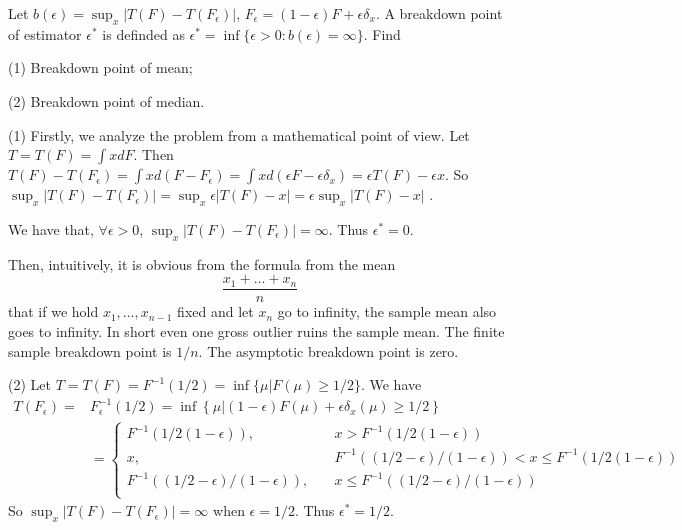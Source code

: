\begin{problem}
    Let $b(\epsilon)=\sup_x|T(F)-T(F_\epsilon)|$, $F_\epsilon=(1-\epsilon)F+\epsilon\delta_x$. A breakdown point of estimator $\epsilon^*$ is definded as $\epsilon^*=\inf\{\epsilon> 0: b(\epsilon)=\infty\}$. Find

    (1) Breakdown point of mean;

    (2) Breakdown point of median. 
\end{problem}

\begin{solution}
    (1) 
    Firstly, we analyze the problem from a mathematical point of view. 
    Let $T = T(F) = \int x dF$. 
    Then $T(F) - T(F_\epsilon) = \int x d (F - F_\epsilon) = \int x d (\epsilon F - \epsilon\delta_x) =  \epsilon T(F) - \epsilon x $.
    So $\sup_x|T(F)-T(F_\epsilon)| = \sup_x \epsilon  | T(F) - x | = \epsilon  \sup_x | T(F) - x | $ . 
    
    We have that, $\forall \epsilon >0 $, $\sup_x|T(F)-T(F_\epsilon)| = \infty$. 
    Thus $\epsilon^* = 0$.

    Then, intuitively\citep{Charles2006}, it is obvious from the formula from the mean 
    \begin{equation*}
        \frac{x_1 + \dots + x_n}{n}
    \end{equation*}
    that if we hold $x_1,\dots, x_{n-1}$ fixed and let $x_n$ go to infinity, the sample mean also goes to infinity. 
    In short  even one gross outlier ruins the sample mean. The finite sample breakdown point is $1/n$. The asymptotic breakdown point is zero.

    (2) Let $T = T(F) = F^{-1}(1/2) = \inf\{\mu | F(\mu) \ge 1/2 \}$. 
    We have 
    \begin{equation*}
        \begin{split}
            T(F_\epsilon) =  & F^{-1}_\epsilon (1/2) = \inf \left\{ \mu | (1-\epsilon)F(\mu) + \epsilon \delta_x(\mu) \ge 1/2 \right\} \\
            & = \left\{
            \begin{split}
                F^{-1} (1/2(1-\epsilon)) , \quad & x > F^{-1} (1/2(1-\epsilon))\\
                x, \quad &  F^{-1} ((1/2 - \epsilon)/(1-\epsilon)) < x \le F^{-1} (1/2(1-\epsilon))\\
                F^{-1} ((1/2 - \epsilon)/(1-\epsilon)) , \quad & x \le F^{-1} ((1/2 - \epsilon)/(1-\epsilon))\\
            \end{split}    
            \right.
        \end{split}
    \end{equation*}
    So $\sup_x|T(F)-T(F_\epsilon)| = \infty$ when $\epsilon=1/2$. Thus $\epsilon^* = 1/2$.


\end{solution}

